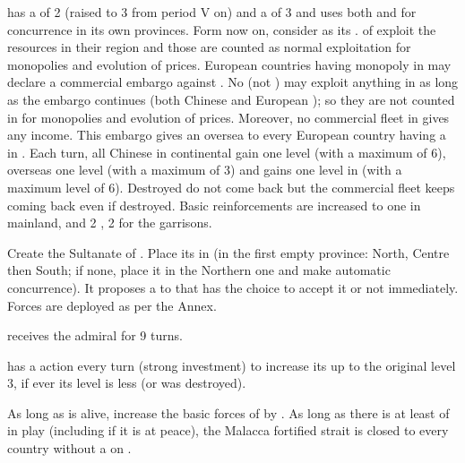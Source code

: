 \effetlong
\aparag \paysChine has a \FTI of 2 (raised to 3 from period V on) and a \DTI
of 3 and uses both \FTI and \DTI for concurrence in its own provinces. Form
now on, consider  as its \CTZ.
\aparag \TP of \paysChine exploit the resources in their region and those are
counted as normal exploitation for monopolies and evolution of prices.
\aparag European countries having monopoly in  may declare a
commercial embargo against \paysChine.  No \TP (not \COL) may exploit anything
in \paysChine as long as the embargo continues (both Chinese and European
\TP); so they are not counted in for monopolies and evolution of
prices. Moreover, no commercial fleet in  gives any income. This
embargo gives an oversea \CB to every European country having a \TP in
\paysChine.
\aparag Each turn, all Chinese \TP in continental \paysChine gain one level
(with a maximum of 6), overseas \TP one level (with a maximum of 3) and
\paysChine gains one \TradeFLEET level in  (with a maximum level
of 6). Destroyed \TP do not come back but the commercial fleet keeps coming
back even if destroyed.
\aparag Basic reinforcements are increased to one \ARMY\faceplus in mainland,
and 2 \LD, 2 \ND for the garrisons.





\phevnt
\aparag Create the Sultanate of \paysaceh. Place its \TP\facemoins in
\granderegionSumatra (in the first empty province: North, Centre then South;
if none, place it in the Northern one and make automatic concurrence).
\bparag It proposes a \dipAT to \TUR that has the choice to accept it or not
immediately.
\bparag Forces are deployed as per the Annex.

\aparag[Malahayati] [BLP] \paysaceh receives the admiral
 for 9 turns.

\effetlong
\aparag \paysaceh has a \TP action every turn (strong investment) to increase
its \TP up to the original level 3, if ever its level is less (or was
destroyed).

\aparag[Malahayati] [BLP] As long as \leaderMalahayati is alive, increase the
basic forces of \paysaceh by \FLEET\faceplus.
\bparag As long as there is at least \FLEET\facemoins of \paysaceh in play
(including if it is at peace), the Malacca fortified strait is closed to every
country without a \dipAT on \paysaceh.


